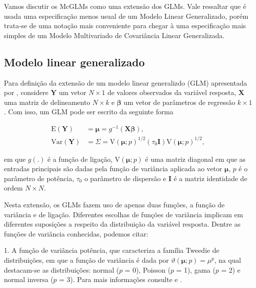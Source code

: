 Vamos discutir os McGLMs como uma extensão dos GLMs. Vale ressaltar que é usada uma especificação menos usual de um Modelo Linear Generalizado, porém trata-se de uma notação mais conveniente para chegar à uma especificação mais simples de um Modelo Multivariado de Covariância Linear Generalizada.

\subsection{Modelo linear generalizado}

Para definição da extensão de um modelo linear generalizdo (GLM) apresentada por \citet{Bonat16}, considere $\boldsymbol{Y}$ um vetor $N \times 1$ de valores observados da variável resposta, $\boldsymbol{X}$ uma matriz de delineamento $N \times k$ e $\boldsymbol{\beta}$ um vetor de parâmetros de regressão $k \times 1$. Com isso, um GLM pode ser escrito da seguinte forma 

\begin{equation}
\label{eq:glm}
      \begin{aligned}
        \mathrm{E}(\boldsymbol{Y}) &=
         \boldsymbol{\mu} =
            g^{-1}(\boldsymbol{X} \boldsymbol{\beta}),
            \\
        \mathrm{Var}(\boldsymbol{Y}) &=
          \Sigma =
          \mathrm{V}\left(\boldsymbol{\mu}; p\right)^{1/2}\left(\tau_0\boldsymbol{I}\right)\mathrm{V}\left(\boldsymbol{\mu}; p\right)^{1/2},
      \end{aligned}
\end{equation}

\noindent em que $g(.)$ é a função de ligação, $\mathrm{V}\left(\boldsymbol{\mu}; p\right)$ é uma matriz diagonal em que as entradas principais são dadas pela função de variância aplicada ao vetor $\boldsymbol{\mu}$, $p$ é o parâmetro de potência, $\tau_0$ o parâmetro de dispersão e $\boldsymbol{I}$ é a matriz identidade de ordem $N\times N$.

Nesta extensão, os GLMs fazem uso de apenas duas funções, a função de variância e de ligação. Diferentes escolhas de funções de variância implicam em diferentes suposições a respeito da distribuição da variável resposta. Dentre as funções de variância conhecidas, podemos citar:

1. A função de variância potência, que caracteriza a família Tweedie de distribuições, em que a função de variância é dada por $\vartheta\left(\boldsymbol{\mu}; p\right) = \mu^p$, na qual destacam-se as distribuições: normal ($p$ = 0), Poisson ($p$ = 1), gama ($p$ = 2) e  normal inversa ($p$ = 3). Para mais informações consulte \citet{Jorgensen87} e \citet{Jorgensen97}.

